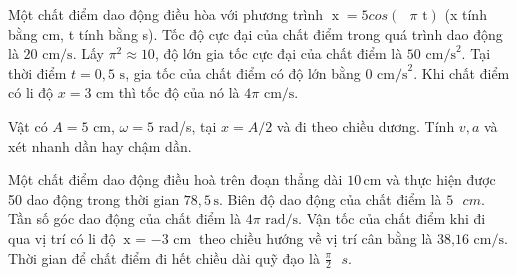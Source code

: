 \begin{ex}[TTN] Một chất điểm dao động điều hòa với phương trình $\operatorname{x} = 5 cos\left( \text{ }\!\!\pi\!\!\text{ t} \right)$ (x tính bằng cm, t tính bằng s).
\choiceTF
{Tốc độ cực đại của chất điểm trong quá trình dao động là $20\text{ cm/s}$.}
{\True Lấy $\pi^2 \approx 10$, độ lớn gia tốc cực đại của chất điểm là $50\text{ cm/s}^2$.}
{\True Tại thời điểm $t = 0,5\text{ s}$, gia tốc của chất điểm có độ lớn bằng $0\text{ cm/s}^2$.}
{\True Khi chất điểm có li độ $x = 3\text{ cm}$ thì tốc độ của nó là $4\pi\text{ cm/s}$.}
\end{ex}

\begin{ex}
Vật có $A=5$ cm, $\omega=5$ rad/s, tại $x=A/2$ và đi theo chiều dương. Tính $v,a$ và xét nhanh dần hay chậm dần.
\choiceTF

\end{ex}

\begin{ex}[TTN] Một chất điểm dao động điều hoà trên đoạn thẳng dài $10\,\text{cm}$ và thực hiện được 50 dao động trong thời gian $78,5\,\text{s}$.
\choiceTF
{\True Biên độ dao động của chất điểm là $5\text{ }cm.$}
{Tần số góc dao động của chất điểm là $\text{4}\pi \text{ rad/s}\text{.}$}
{\True Vận tốc của chất điểm khi đi qua vị trí có li độ $\text{x = }-\text{3 cm}$ theo chiều hướng về vị trí cân bằng là $\text{38,16 cm/s}\text{.}$}
{Thời gian để chất điểm đi hết chiều dài quỹ đạo là $\frac{\pi }{2}\text{ }s.$}
\end{ex}

